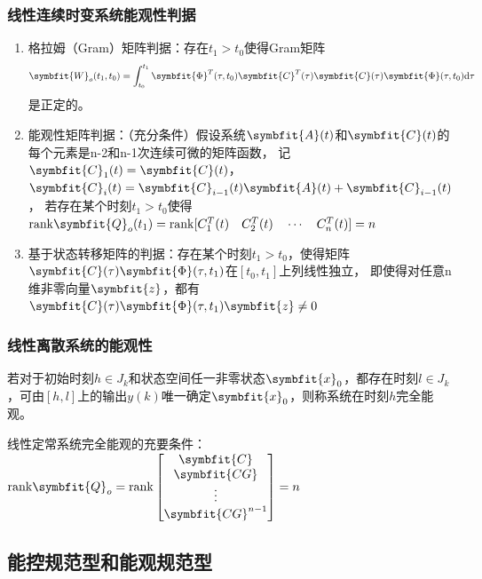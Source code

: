 \documentclass[11pt,a4paper]{ctexart}
\renewcommand{\d}{{\rm d}}
\newcommand{\bm}{\symbfit}
\begin{document}
        \subsubsection{线性连续时变系统能观性判据}
        \begin{enumerate}
            \item 格拉姆（Gram）矩阵判据：存在$t_1>t_0$使得Gram矩阵
            \[
            \bm{W}_o(t_1,t_0)=\int_{t_0}^{t_1}\bm{\Phi}^T(\tau,t_0)\bm{C}^T(\tau)\bm{C}(\tau)\bm{\Phi}(\tau,t_0)\d\tau
            \]
            是正定的。
            \item 能观性矩阵判据：（充分条件）假设系统$\bm{A}(t)$和$\bm{C}(t)$的每个元素是n-2和n-1次连续可微的矩阵函数，
            记$\bm{C}_1(t)=\bm{C}(t)$，$\bm{C}_i(t)=\bm{C}_{i-1}(t)\bm{A}(t)+\bm{C}_{i-1}(t)$，
            若存在某个时刻$t_1>t_0$使得${\rm rank}\bm{Q}_o(t_1)={\rm rank}[C_1^T(t)\quad C_2^T(t)\quad\cdots\quad C_n^T(t)]=n$
            \item 基于状态转移矩阵的判据：存在某个时刻$t_1>t_0$，使得矩阵$\bm{C}(\tau)\bm{\Phi}(\tau,t_1)$在$[t_0,t_1]$上列线性独立，
            即使得对任意n维非零向量$\bm{z}$，都有$\bm{C}(\tau)\bm{\Phi}(\tau,t_1)\bm{z}\neq0$
        \end{enumerate}
        \subsubsection{线性离散系统的能观性}
            若对于初始时刻$h\in J_k$和状态空间任一非零状态$\bm{x}_0$，都存在时刻$l\in J_k$，可由$[h,l]$上的输出$y(k)$唯一确定$\bm{x}_0$，则称系统在时刻$h$完全能观。

            线性定常系统完全能观的充要条件：${\rm rank}\bm{Q}_o={\rm rank}\begin{bmatrix}\bm{C}\\ \bm{CG}\\ \vdots\\ \bm{CG}^{n-1}\end{bmatrix}=n$
    \subsection{能控规范型和能观规范型}
\end{document}
